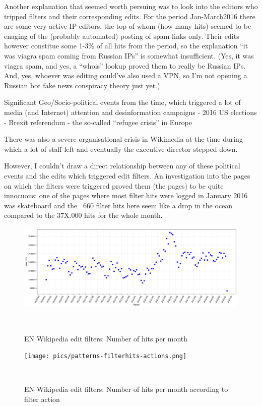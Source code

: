 Another explanation that seemed worth persuing was to look into the editors who tripped filters and their corresponding edits.
For the period Jan-March2016 there are some very active IP editors, the top of whom (how many hits) seemed to be enaging of the (probably automated) posting of spam links only.
Their edits however constitue some 1-3\% of all hits from the period, so the explanation ``it was viagra spam coming from Russian IPs'' is somewhat insufficient.
(Yes, it was viagra spam, and yes, a ``whois'' lookup proved them to really be Russian IPs.
And, yes, whoever was editing could've also used a VPN, so I'm not opening a Russian bot fake news conspiracy theory just yet.)


Significant Geo/Socio-political events from the time, which triggered a lot of media (and Internet) attention and desinformation campaigns
- 2016 US elections
- Brexit referendum
- the so-called ``refugee crisis'' in Europe

There was also a severe organisational crisis in Wikimedia at the time during which a lot of staff left and eventually the executive director stepped down.


However, I couldn't draw a direct relationship between any of these political events and the edits which triggered edit filters.
An investigation into the pages on which the filters were triggered proved them (the pages) to be quite innocuous:
one of the pages where most filter hits were logged in January 2016 was skateboard and the ~660 filter hits here seem like a drop in the ocean compared to the 37X.000 hits for the whole month.


\begin{landscape}
\begin{figure}
\centering
  \includegraphics[width=0.9\columnwidth]{pics/filter-hits-zoomed.png}
  \caption{EN Wikipedia edit filters: Number of hits per month}~\label{fig:filter-hits}
\end{figure}
\end{landscape}

\begin{figure}
\centering
  \texttt{[image: pics/patterns-filterhits-actions.png]}
  \caption{EN Wikipedia edit filters: Number of hits per month according to filter action}~\label{fig:filter-hits-actions}
\end{figure}


